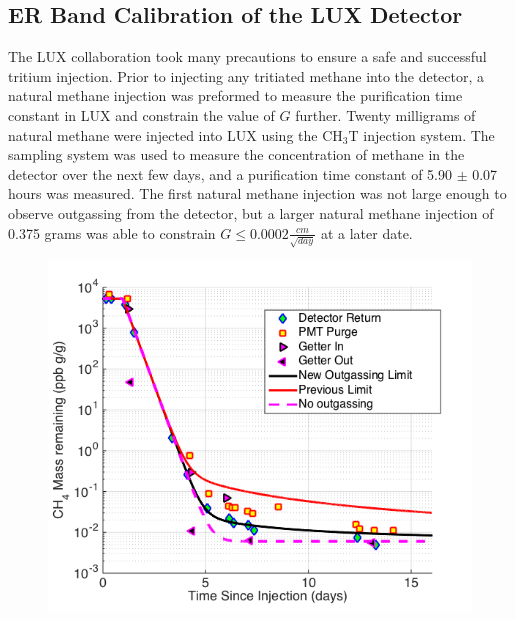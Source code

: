 \documentclass[a4paper,12pt]{article}
\begin{document}
{\subsection{ER Band Calibration of the LUX Detector} \label{DiscrimSec}

The LUX collaboration took many precautions to ensure a safe and successful tritium injection. Prior to injecting any tritiated methane into the detector, a natural methane injection was preformed to measure the purification time constant in LUX and constrain the value of $G$ further.   Twenty milligrams of natural methane were injected into LUX using the CH$_3$T injection system. The sampling system was used to measure the concentration of methane in the detector over the next few days, and a purification time constant of 5.90 $\pm$ 0.07 hours was measured.  The first natural methane injection was not large enough to observe outgassing from the detector, but a larger natural methane injection of 0.375 grams was able to constrain $G \le 0.0002 \frac{cm}{\sqrt{day}}$ at a later date.


\begin{figure} [!h]
\includegraphics[scale=.7]{LUXOutgassing.png} 
\label{LuxOutgassing}
\end{figure}

}
\end{document}
